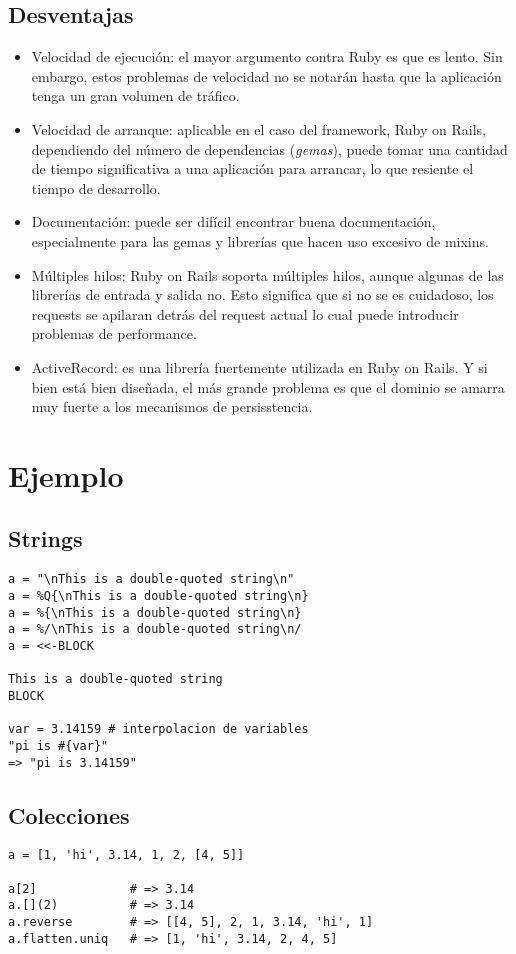\documentclass{IEEEtran}
\begin{document}
\subsection{Desventajas}
\begin{itemize}
  \item Velocidad de ejecuci\'on: el mayor argumento contra Ruby es que es lento. Sin embargo, estos problemas de velocidad no se notar\'an hasta que la aplicaci\'on tenga un gran volumen de tr\'afico.
  \item Velocidad de arranque: aplicable en el caso del framework, Ruby on Rails, dependiendo del n\'umero de dependencias (\emph{gemas}), puede tomar una cantidad de tiempo significativa a una aplicaci\'on para arrancar, lo que resiente el tiempo de desarrollo.
  \item Documentaci\'on: puede ser dif\'icil encontrar buena documentaci\'on, especialmente para las gemas y librer\'ias que hacen uso excesivo de mixins.
  \item M\'ultiples hilos: Ruby on Rails soporta m\'ultiples hilos, aunque algunas de las librer\'ias de entrada y salida no. Esto significa que si no se es cuidadoso, los requests se apilaran detr\'as del request actual lo cual puede introducir problemas de performance.
  \item ActiveRecord: es una librer\'ia fuertemente utilizada en Ruby on Rails. Y si bien est\'a bien dise\~nada, el m\'as grande problema es que el dominio se amarra muy fuerte a los mecanismos de persisstencia.
\end{itemize}
\section{Ejemplo}
\subsection{Strings}
\begin{lstlisting}
a = "\nThis is a double-quoted string\n"
a = %Q{\nThis is a double-quoted string\n}
a = %{\nThis is a double-quoted string\n}
a = %/\nThis is a double-quoted string\n/
a = <<-BLOCK

This is a double-quoted string
BLOCK

var = 3.14159 # interpolacion de variables
"pi is #{var}"
=> "pi is 3.14159"
\end{lstlisting}

\subsection{Colecciones}
\begin{lstlisting}
a = [1, 'hi', 3.14, 1, 2, [4, 5]]

a[2]             # => 3.14
a.[](2)          # => 3.14
a.reverse        # => [[4, 5], 2, 1, 3.14, 'hi', 1]
a.flatten.uniq   # => [1, 'hi', 3.14, 2, 4, 5]
\end{lstlisting}
\end{document}
